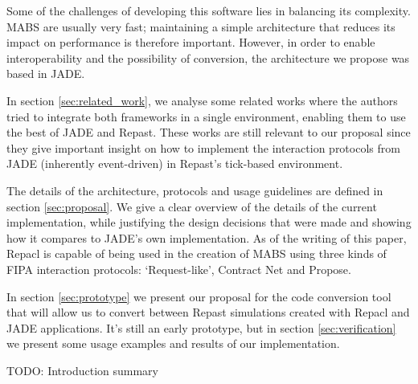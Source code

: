 Some of the challenges of developing this software lies in balancing its complexity. MABS are usually very fast; maintaining a simple architecture that reduces its impact on performance is therefore important. However, in order to enable interoperability and the possibility of conversion, the architecture we propose was based in JADE.

In section \ref{sec:related_work}, we analyse some related works where the authors tried to integrate both frameworks in a single environment, enabling them to use the best of JADE and Repast. These works are still relevant to our proposal since they give important insight on how to implement the interaction protocols from JADE (inherently event-driven) in Repast's tick-based environment.

The details of the architecture, protocols and usage guidelines are defined in section \ref{sec:proposal}. We give a clear overview of the details of the current implementation, while justifying the design decisions that were made and showing how it compares to JADE's own implementation. As of the writing of this paper, Repacl is capable of being used in the creation of MABS using three kinds of FIPA interaction protocols: `Request-like', Contract Net and Propose.

In section \ref{sec:prototype} we present our proposal for the code conversion tool that will allow us to convert between Repast simulations created with Repacl and JADE applications. It's still an early prototype, but in section \ref{sec:verification} we present some usage examples and results of our implementation.

 TODO: Introduction summary
